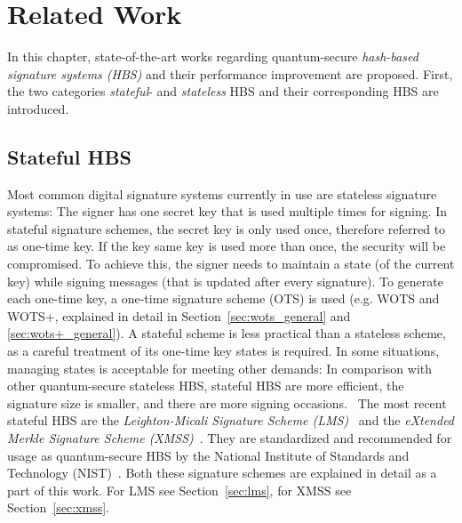 \chapter{Related Work}
\label{cha:stateOfTheArt}

In this chapter, state-of-the-art works regarding quantum-secure \textit{hash-based signature systems (HBS)} and their performance improvement are proposed. 
First, the two categories \textit{stateful}- and \textit{stateless} HBS and their corresponding HBS are introduced. %

\section{Stateful HBS} %
Most common digital signature systems currently in use are stateless signature systems: The signer has one secret key that is used multiple times for signing. In stateful signature schemes, the secret key is only used once, therefore referred to as one-time key. If the key same key is used more than once, the security will be compromised. 
To achieve this, the signer needs to maintain a state (of the current key) while signing messages (that is updated after every signature). To generate each one-time key, a one-time signature scheme (OTS) is used (e.g. WOTS and WOTS+, explained in detail in Section~\ref{sec:wots_general} and \ref{sec:wots+_general}).
A stateful scheme is less practical than a stateless scheme, as a careful treatment of its one-time key states is required. 
In some situations, managing states is acceptable for meeting other demands: In comparison with other quantum-secure stateless HBS, stateful HBS are more efficient, the signature size is smaller, and there are more signing occasions.~\cite{properties_stateless_HBS_2022}
The most recent stateful HBS are the \textit{Leighton-Micali Signature Scheme (LMS)}~\cite{LMS_RFC8554} and the \textit{eXtended Merkle Signature Scheme (XMSS)}~\cite{xmss_RFC8391}. They are standardized and recommended for usage as quantum-secure HBS by the National Institute of Standards and Technology (NIST)~\cite{stateful_hashbased_sign_schemes_NIST_2020}. Both these signature schemes are explained in detail as a part of this work. For LMS see Section~\ref{sec:lms}, for XMSS see Section~\ref{sec:xmss}.


